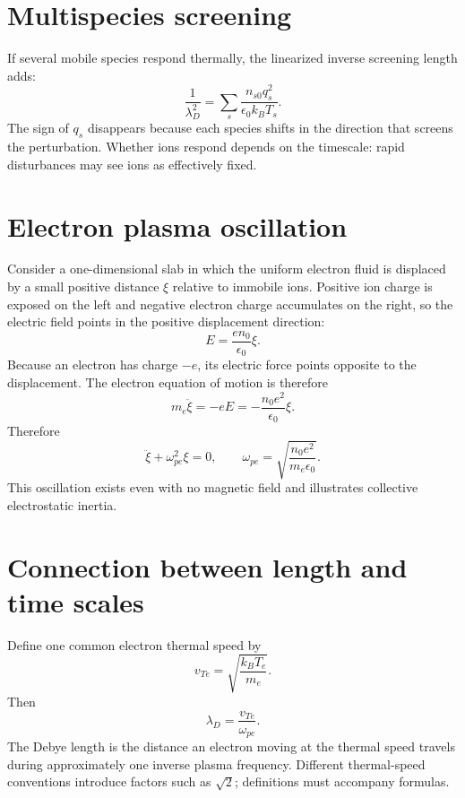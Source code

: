 \documentclass[11pt]{article}
\begin{document}
\section{Multispecies screening}

If several mobile species respond thermally, the linearized inverse screening length adds:
\begin{equation}
\frac{1}{\lambda_D^2}=
\sum_s\frac{n_{s0}q_s^2}{\epsilon_0k_BT_s}.
\end{equation}
The sign of $q_s$ disappears because each species shifts in the direction that screens the perturbation. Whether ions respond depends on the timescale: rapid disturbances may see ions as effectively fixed.


\section{Electron plasma oscillation}

Consider a one-dimensional slab in which the uniform electron fluid is displaced by a small positive distance $\xi$ relative to immobile ions. Positive ion charge is exposed on the left and negative electron charge accumulates on the right, so the electric field points in the positive displacement direction:
\begin{equation}
E=\frac{en_0}{\epsilon_0}\xi.
\end{equation}
Because an electron has charge $-e$, its electric force points opposite to the displacement. The electron equation of motion is therefore
\begin{equation}
m_e\ddot\xi=-eE=-\frac{n_0e^2}{\epsilon_0}\xi.
\end{equation}
Therefore
\begin{equation}
\ddot\xi+\omega_{pe}^2\xi=0,\qquad
\boxed{\omega_{pe}=\sqrt{\frac{n_0e^2}{m_e\epsilon_0}}}.
\end{equation}
This oscillation exists even with no magnetic field and illustrates collective electrostatic inertia.


\section{Connection between length and time scales}

Define one common electron thermal speed by
\begin{equation}
v_{Te}=\sqrt{\frac{k_BT_e}{m_e}}.
\end{equation}
Then
\begin{equation}
\boxed{\lambda_D=\frac{v_{Te}}{\omega_{pe}}}.
\end{equation}
The Debye length is the distance an electron moving at the thermal speed travels during approximately one inverse plasma frequency. Different thermal-speed conventions introduce factors such as $\sqrt{2}$; definitions must accompany formulas.
\end{document}
